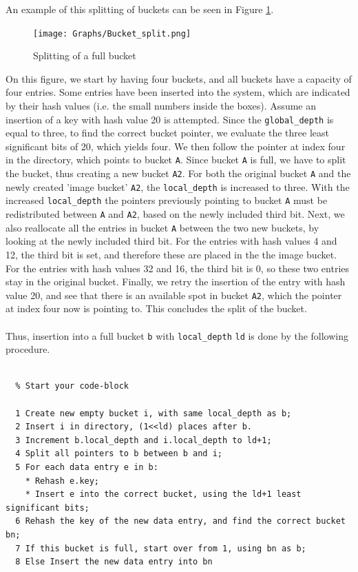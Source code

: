 \documentclass[11pt]{article} %
\begin{document}
An example of this splitting of buckets can be seen in Figure \ref{fig:bucket_split}.
\begin{figure}[H]
  \centering
  \texttt{[image: Graphs/Bucket\_split.png]}
  \caption{Splitting of a full bucket}
  \label{fig:bucket_split}
\end{figure}
On this figure, we start by having four buckets, and all buckets have a capacity of four entries. Some entries have been inserted into the system, which are indicated by their hash values (i.e. the small numbers inside the boxes). Assume an insertion of a key with hash value 20 is attempted. Since the \verb|global_depth| is equal to three, to find the correct bucket pointer, we evaluate the three least significant bits of 20, which yields four. We then follow the pointer at index four in the directory, which points to bucket \verb|A|. Since bucket \verb|A| is full, we have to split the bucket, thus creating a new bucket \verb|A2|. For both the original bucket \verb|A| and the newly created 'image bucket' \verb|A2|, the \verb|local_depth| is increased to three. With the increased \verb|local_depth| the pointers previously pointing to bucket \verb|A| must be redistributed between \verb|A| and \verb|A2|, based on the newly included third bit. Next, we also reallocate all the entries in bucket \verb|A| between the two new buckets, by looking at the newly included third bit. For the entries with hash values 4 and 12, the third bit is set, and therefore these are placed in the the image bucket. For the entries with hash values 32 and 16, the third bit is 0, so these two entries stay in the original bucket. Finally, we retry the insertion of the entry with hash value 20, and see that there is an available spot in bucket \verb|A2|, which the pointer at index four now is pointing to. This concludes the split of the bucket.\\
\\
Thus, insertion into a full bucket \verb|b| with \verb|local_depth| \verb|ld| is done by the following procedure.\\
\\
\begin{fminipage}{\linewidth}
\begin{lstlisting}  % Start your code-block

  1 Create new empty bucket i, with same local_depth as b;
  2 Insert i in directory, (1<<ld) places after b.
  3 Increment b.local_depth and i.local_depth to ld+1;
  4 Split all pointers to b between b and i;
  5 For each data entry e in b:
    * Rehash e.key;
    * Insert e into the correct bucket, using the ld+1 least significant bits;
  6 Rehash the key of the new data entry, and find the correct bucket bn;
  7 If this bucket is full, start over from 1, using bn as b;
  8 Else Insert the new data entry into bn
\end{lstlisting}
\end{fminipage}
\end{document}
